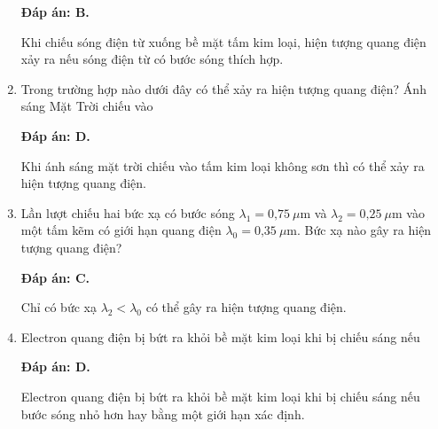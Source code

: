 \begin{enumerate}[label=\bfseries Câu \arabic*:]
	\loigiai
	{		\textbf{Đáp án: B.}
		
Khi chiếu sóng điện từ xuống bề mặt tấm kim loại, hiện tượng quang điện xảy ra nếu sóng điện từ có bước sóng thích hợp.
		
	}
	
	\item {} 
	
	\cauhoi
	{Trong trường hợp nào dưới đây có thể xảy ra hiện tượng quang điện? Ánh sáng Mặt Trời chiếu vào
	}
	
	\loigiai
	{		\textbf{Đáp án: D.}
		
Khi ánh sáng mặt trời chiếu vào tấm kim loại không sơn thì có thể xảy ra hiện tượng quang điện.
		
	}
	
	\item {} 
	
	\cauhoi
	{Lần lượt chiếu hai bức xạ có bước sóng $\lambda_1=\text{0,75}\ \mu \text{m}$ và $\lambda_2=\text{0,25}\ \mu \text{m}$ vào một tấm kẽm có giới hạn quang điện $\lambda_0=\text{0,35}\ \mu \text{m}$. Bức xạ nào gây ra hiện tượng quang điện?
	}
	
	\loigiai
	{		\textbf{Đáp án: C.}
		
Chỉ có bức xạ $ \lambda_{2} < \lambda_{0}  $ có thể gây ra hiện tượng quang điện.
		
	}
	
\item {} 
	
	\cauhoi
	{Electron quang điện bị bứt ra khỏi bề mặt kim loại khi bị chiếu sáng nếu
	}
	
	\loigiai
	{		\textbf{Đáp án: D.}
		
Electron quang điện bị bứt ra khỏi bề mặt kim loại khi bị chiếu sáng nếu bước sóng nhỏ hơn hay bằng một giới hạn xác định. 
		
	}
	
\end{enumerate}

